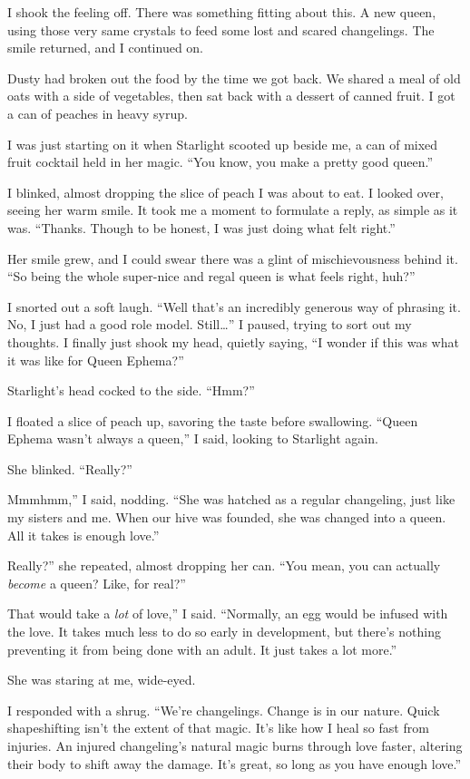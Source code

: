 I shook the feeling off. There was something fitting about this. A new queen, using those very same crystals to feed some lost and scared changelings. The smile returned, and I continued on.

{\br}%
Dusty had broken out the food by the time we got back. We shared a meal of old oats with a side of vegetables, then sat back with a dessert of canned fruit. I got a can of peaches in heavy syrup.

I was just starting on it when Starlight scooted up beside me, a can of mixed fruit cocktail held in her magic. “You know, you make a pretty good queen.”

I blinked, almost dropping the slice of peach I was about to eat. I looked over, seeing her warm smile. It took me a moment to formulate a reply, as simple as it was. “Thanks. Though to be honest, I was just doing what felt right.”

Her smile grew, and I could swear there was a glint of mischievousness behind it. “So being the whole super-nice and regal queen is what feels right, huh?”

I snorted out a soft laugh. “Well that’s an incredibly generous way of phrasing it. No, I just had a good role model. Still…” I paused, trying to sort out my thoughts. I finally just shook my head, quietly saying, “I wonder if this was what it was like for Queen Ephema?”

Starlight’s head cocked to the side. “Hmm?”

I floated a slice of peach up, savoring the taste before swallowing. “Queen Ephema wasn’t always a queen,” I said, looking to Starlight again.

She blinked. “Really?”

\leavevmode{}Mmmhmm,” I said, nodding. “She was hatched as a regular changeling, just like my sisters and me. When our hive was founded, she was changed into a queen. All it takes is enough love.”

\leavevmode{}Really?” she repeated, almost dropping her can. “You mean, you can actually \textit{become} a queen? Like, for real?”

\leavevmode{}That would take a \textit{lot} of love,” I said. “Normally, an egg would be infused with the love. It takes much less to do so early in development, but there’s nothing preventing it from being done with an adult. It just takes a lot more.”

She was staring at me, wide-eyed.

I responded with a shrug. “We’re changelings. Change is in our nature. Quick shapeshifting isn’t the extent of that magic. It’s like how I heal so fast from injuries. An injured changeling’s natural magic burns through love faster, altering their body to shift away the damage. It’s great, so long as you have enough love.”

